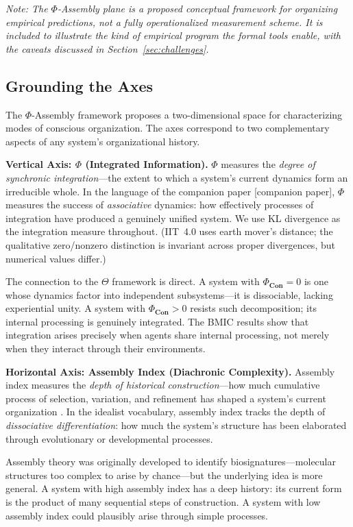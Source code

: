 \documentclass[11pt,a4paper]{article}
\theoremstyle{definition}
\theoremstyle{plain}
\theoremstyle{remark}
\newcommand{\Con}{\mathbf{Con}}
\begin{document}
\textit{Note: The $\Phi$-Assembly plane is a proposed conceptual framework for organizing empirical predictions, not a fully operationalized measurement scheme. It is included to illustrate the kind of empirical program the formal tools enable, with the caveats discussed in Section~\ref{sec:challenges}.}

\subsection{Grounding the Axes}\label{sec:axes}

The $\Phi$-Assembly framework proposes a two-dimensional space for characterizing modes of conscious organization. The axes correspond to two complementary aspects of any system's organizational history.

\textbf{Vertical Axis: $\Phi$ (Integrated Information).} $\Phi$ measures the \textit{degree of synchronic integration}---the extent to which a system's current dynamics form an irreducible whole. In the language of the companion paper [companion paper], $\Phi$ measures the success of \textit{associative} dynamics: how effectively processes of integration have produced a genuinely unified system. We use KL divergence as the integration measure throughout. (IIT~4.0 uses earth mover's distance; the qualitative zero/nonzero distinction is invariant across proper divergences, but numerical values differ.)

The connection to the $\Theta$ framework is direct. A system with $\Phi_{\Con} = 0$ is one whose dynamics factor into independent subsystems---it is dissociable, lacking experiential unity. A system with $\Phi_{\Con} > 0$ resists such decomposition; its internal processing is genuinely integrated. The BMIC results show that integration arises precisely when agents share internal processing, not merely when they interact through their environments.

\textbf{Horizontal Axis: Assembly Index (Diachronic Complexity).} Assembly index measures the \textit{depth of historical construction}---how much cumulative process of selection, variation, and refinement has shaped a system's current organization \citep{Cronin2021}. In the idealist vocabulary, assembly index tracks the depth of \textit{dissociative differentiation}: how much the system's structure has been elaborated through evolutionary or developmental processes.

Assembly theory was originally developed to identify biosignatures---molecular structures too complex to arise by chance---but the underlying idea is more general. A system with high assembly index has a deep history: its current form is the product of many sequential steps of construction. A system with low assembly index could plausibly arise through simple processes.
\end{document}
